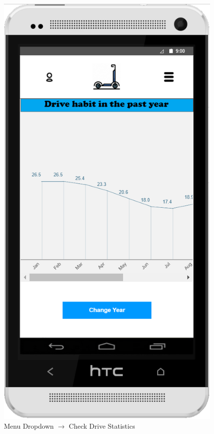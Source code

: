\documentclass[a4paper, 12pt]{article}
\begin{document}
\begin{figure} [htbp]
  \begin{center}
    \includegraphics[scale=0.75]{images/prototypes/02-03-menu-dropdown--check-drive-statistics.png}
  \end{center}
  \caption{Menu Dropdown $\rightarrow$ Check Drive Statistics}
\end{figure}
\end{document}
